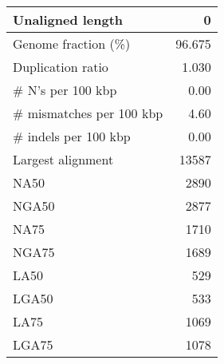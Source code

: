 \documentclass[12pt,a4paper]{article}
\begin{document}
\begin{table}[ht]
\begin{center}
\begin{tabular}{|l*{1}{|r}|}
Unaligned length & 0 \\ \hline
Genome fraction (\%) & 96.675 \\ \hline
Duplication ratio & 1.030 \\ \hline
\# N's per 100 kbp & 0.00 \\ \hline
\# mismatches per 100 kbp & 4.60 \\ \hline
\# indels per 100 kbp & 0.00 \\ \hline
Largest alignment & 13587 \\ \hline
NA50 & 2890 \\ \hline
NGA50 & 2877 \\ \hline
NA75 & 1710 \\ \hline
NGA75 & 1689 \\ \hline
LA50 & 529 \\ \hline
LGA50 & 533 \\ \hline
LA75 & 1069 \\ \hline
LGA75 & 1078 \\ \hline
\end{tabular}
\end{center}
\end{table}
\end{document}
